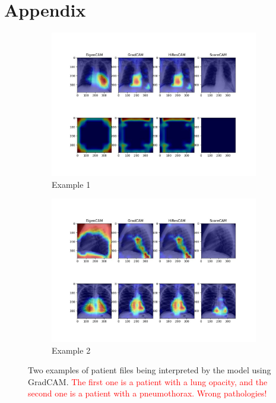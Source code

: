 \documentclass[11pt]{article}
\newcommand\myworries[1]{\textcolor{red}{#1}}
\begin{document}
            \section{Appendix}


        \begin{figure}[H]
                 \centering
                 \begin{subfigure}[b]{0.45\textwidth}
                     \centering
                     \includegraphics[width=\textwidth]{plots/heatmaps_0}
                     \caption{Example 1}
                     \vspace{4ex}

                 \end{subfigure}
                 \hfill
                 \begin{subfigure}[b]{0.45\textwidth}
                     \centering
                     \includegraphics[width=\textwidth]{plots/heatmaps_1}
                     \caption{Example 2}
                     \vspace{4ex}

                 \end{subfigure}
                 \label{fig:gradcam_example_chexpert_3}
                 \caption{Two examples of patient files being interpreted by the model using GradCAM. \myworries{The first one is a patient with a lung opacity, and the second one is a patient with a pneumothorax. Wrong pathologies!}}

            \end{figure}
\end{document}
